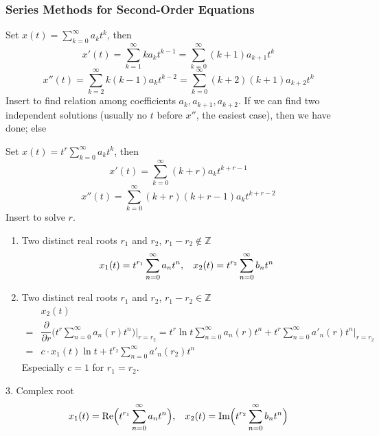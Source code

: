 \documentclass{beamer}
\begin{document}
\begin{frame}
\frametitle{Series Methods for Second-Order Equations}
Set $x(t)=\sum\limits_{k=0}^{\infty}a_kt^k$, then
$$x'(t)=\sum\limits_{k=1}^{\infty}ka_kt^{k-1}=\sum\limits_{k=0}^{\infty}(k+1)a_{k+1}t^{k}$$
$$x''(t)=\sum\limits_{k=2}^{\infty}k(k-1)a_kt^{k-2}=\sum\limits_{k=0}^{\infty}(k+2)(k+1)a_{k+2}t^{k}$$
Insert to find relation among coefficients $a_k,a_{k+1},a_{k+2}$. If we can find two independent solutions (usually no $t$ before $x''$, the easiest case), then we have done; else

\end{frame}
\begin{frame}
Set $x(t)=t^r\sum\limits_{k=0}^{\infty}a_kt^k$, then
$$x'(t)=\sum\limits_{k=0}^{\infty}(k+r)a_kt^{k+r-1}$$
$$x''(t)=\sum\limits_{k=0}^{\infty}(k+r)(k+r-1)a_kt^{k+r-2}$$
Insert to solve $r$.
\end{frame}
\begin{frame}
\begin{enumerate}
\item Two distinct real roots $r_1$ and $r_2$, $r_1-r_2\notin\mathbb{Z}$
$$x_1(t)=t^{r_1}\sum\limits_{n=0}^{\infty}a_nt^n,\hspace{3mm}x_2(t)=t^{r_2}\sum\limits_{n=0}^{\infty}b_nt^n$$
\item Two distinct real roots $r_1$ and $r_2$, $r_1-r_2\in\mathbb{Z}$
\begin{align*}
&x_2(t)\\
=&\dfrac{\partial}{\partial r}\Big(t^r\sum\limits_{n=0}^{\infty}a_n(r)t^n\Big)\Bigg|_{r=r_2}=t^{r}\ln t\sum\limits_{n=0}^{\infty}a_n(r)t^n+t^{r}\sum\limits_{n=0}^{\infty}a'_n(r)t^n\Bigg|_{r=r_2}\\
=&c\cdot x_1(t)\ln t+t^{r_2}\sum\limits_{n=0}^{\infty}a'_n(r_2)t^n
\end{align*}
Especially $c=1$ for $r_1=r_2$.
\end{enumerate}
\end{frame}
\begin{frame}
\begin{block}{3. Complex root}
$$x_1(t)=\text{Re}\Big(t^{r_1}\sum\limits_{n=0}^{\infty}a_nt^n\Big),\hspace{3mm}x_2(t)=\text{Im}\Big(t^{r_2}\sum\limits_{n=0}^{\infty}b_nt^n\Big)$$

\end{block}
\end{frame}
\end{document}
